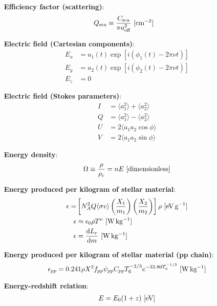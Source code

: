 \documentclass[a4paper,10pt]{article}
\begin{document}
{\noindent}\textbf{Efficiency factor (scattering)}:
\begin{align*}
    Q_{\rm sca} &\equiv \frac{C_{\rm sca}}{\pi a_{\rm eff}^2} ~ [{\rm cm^{-2}}]
\end{align*}

{\noindent}\textbf{Electric field (Cartesian components)}:
\begin{align*}
    E_x &= a_1(t)\exp[i(\phi_1(t)-2\pi\nu t)] \\
    E_y &= a_2(t)\exp[i(\phi_2(t)-2\pi\nu t)] \\
    E_z &= 0
\end{align*}

{\noindent}\textbf{Electric field (Stokes parameters)}:
\begin{align*}
    I &= \langle{a_1^2}\rangle + \langle{a_2^2}\rangle \\
    Q &= \langle{a_1^2}\rangle - \langle{a_2^2}\rangle \\
    U &= 2\langle{a_1a_2\cos\phi}\rangle \\
    V &= 2\langle{a_1a_2\sin\phi}\rangle
\end{align*}

{\noindent}\textbf{Energy density}:
\begin{align*}
    \Omega \equiv \dfrac{\rho}{\rho_c} = nE ~ [{\rm dimensionless}]
\end{align*}

{\noindent}\textbf{Energy produced per kilogram of stellar material}:
\begin{align*}
    \epsilon = &\left[ N_A^2Q \langle\sigma v\rangle \left(\frac{X_1}{m_1}\right) \left(\frac{X_2}{m_2}\right) \right] \rho ~ [{\rm eV\,g^{-1}}] \\
    \epsilon &\approx \epsilon_0\rho T^\nu ~ [{\rm W\,kg^{-1}}] \\
    \epsilon &= \frac{{\rm d}L_r}{{\rm d}m} ~ [{\rm W\,kg^{-1}}]
\end{align*}

{\noindent}\textbf{Energy produced per kilogram of stellar material (pp chain)}:
\begin{align*}
    \epsilon_{pp} = 0.241\rho X^2 f_{pp}\psi_{pp}C_{pp}T_6^{-2/3}e^{-33.80T_6^{-1/3}} ~ [{\rm W\,kg^{-1}}]
\end{align*}

{\noindent}\textbf{Energy-redshift relation}:
\begin{align*}
    E = E_0(1+z) ~ [{\rm eV}]
\end{align*}
\end{document}
